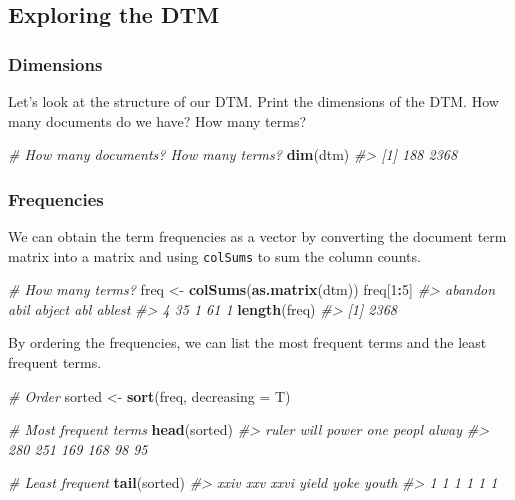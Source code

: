 \documentclass[]{book}
\newenvironment{Shaded}{\begin{snugshade}}{\end{snugshade}}
\newcommand{\KeywordTok}[1]{\textcolor[rgb]{0.13,0.29,0.53}{\textbf{#1}}}
\newcommand{\DataTypeTok}[1]{\textcolor[rgb]{0.13,0.29,0.53}{#1}}
\newcommand{\DecValTok}[1]{\textcolor[rgb]{0.00,0.00,0.81}{#1}}
\newcommand{\StringTok}[1]{\textcolor[rgb]{0.31,0.60,0.02}{#1}}
\newcommand{\CommentTok}[1]{\textcolor[rgb]{0.56,0.35,0.01}{\textit{#1}}}
\newcommand{\OperatorTok}[1]{\textcolor[rgb]{0.81,0.36,0.00}{\textbf{#1}}}
\newcommand{\NormalTok}[1]{#1}
\begin{document}
\subsection{Exploring the DTM}\label{exploring-the-dtm}

\subsubsection*{Dimensions}\label{dimensions}

Let's look at the structure of our DTM. Print the dimensions of the DTM.
How many documents do we have? How many terms?

\begin{Shaded}
\begin{Highlighting}[]
\CommentTok{# How many documents? How many terms?}
\KeywordTok{dim}\NormalTok{(dtm)}
\CommentTok{#> [1]  188 2368}
\end{Highlighting}
\end{Shaded}

\subsubsection*{Frequencies}\label{frequencies}

We can obtain the term frequencies as a vector by converting the
document term matrix into a matrix and using \texttt{colSums} to sum the
column counts.

\begin{Shaded}
\begin{Highlighting}[]
\CommentTok{# How many terms?}
\NormalTok{freq <-}\StringTok{ }\KeywordTok{colSums}\NormalTok{(}\KeywordTok{as.matrix}\NormalTok{(dtm))}
\NormalTok{freq[}\DecValTok{1}\OperatorTok{:}\DecValTok{5}\NormalTok{]}
\CommentTok{#> abandon    abil  abject     abl  ablest }
\CommentTok{#>       4      35       1      61       1}
\KeywordTok{length}\NormalTok{(freq)}
\CommentTok{#> [1] 2368}
\end{Highlighting}
\end{Shaded}

By ordering the frequencies, we can list the most frequent terms and the
least frequent terms.

\begin{Shaded}
\begin{Highlighting}[]
\CommentTok{# Order}
\NormalTok{sorted <-}\StringTok{ }\KeywordTok{sort}\NormalTok{(freq, }\DataTypeTok{decreasing =}\NormalTok{ T)}

\CommentTok{# Most frequent terms}
\KeywordTok{head}\NormalTok{(sorted)}
\CommentTok{#> ruler  will power   one peopl alway }
\CommentTok{#>   280   251   169   168    98    95}

\CommentTok{# Least frequent}
\KeywordTok{tail}\NormalTok{(sorted)}
\CommentTok{#>  xxiv   xxv  xxvi yield  yoke youth }
\CommentTok{#>     1     1     1     1     1     1}
\end{Highlighting}
\end{Shaded}
\end{document}
